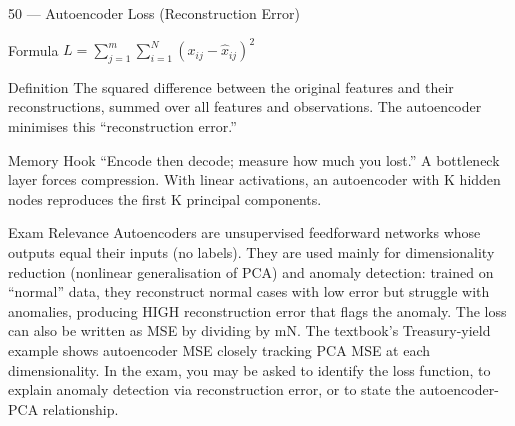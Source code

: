 \documentclass[aspectratio=169,8pt]{beamer}
\begin{document}
		\begin{frame}{50 --- Autoencoder Loss (Reconstruction Error)}
			\begin{block}{Formula}
				$L = \sum_{j=1}^{m}\sum_{i=1}^{N}(x_{ij} - \hat{x}_{ij})^2$
			\end{block}
			\begin{block}{Definition}
				The squared difference between the original features and their reconstructions, summed over all features and observations. The autoencoder minimises this ``reconstruction error.''
			\end{block}
			\begin{block}{Memory Hook}
				``Encode then decode; measure how much you lost.'' A bottleneck layer forces compression. With linear activations, an autoencoder with K hidden nodes reproduces the first K principal components.
			\end{block}
			\begin{block}{Exam Relevance}
				Autoencoders are unsupervised feedforward networks whose outputs equal their inputs (no labels). They are used mainly for dimensionality reduction (nonlinear generalisation of PCA) and anomaly detection: trained on ``normal'' data, they reconstruct normal cases with low error but struggle with anomalies, producing HIGH reconstruction error that flags the anomaly. The loss can also be written as MSE by dividing by mN. The textbook's Treasury-yield example shows autoencoder MSE closely tracking PCA MSE at each dimensionality. In the exam, you may be asked to identify the loss function, to explain anomaly detection via reconstruction error, or to state the autoencoder-PCA relationship.
			\end{block}
		\end{frame}
		
	
\end{document}

